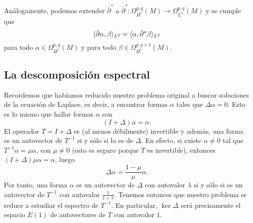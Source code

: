 \documentclass[12pt,a4paper]{article}
\theoremstyle{definition} \newtheorem{defn}[thm]{Definición}
\theoremstyle{definition} \newtheorem{ejemplo}[thm]{Ejemplo}
\theoremstyle{definition} \newtheorem{ejercicio}[thm]{Ejercicio}
\theoremstyle{remark} \newtheorem*{obs}{Observación}
\DeclarePairedDelimiter\esc{\langle}{\rangle}
\newcommand{\dol}{\bar{\partial}}
\begin{document}
    Análogamente, podemos extender $\dol^*$ a $\dol^*:\Omega^{p,q}_{H^1}(M) \rightarrow \Omega^{p,q}_{L^2}(M)$ y se cumple que
    \begin{equation*}
      \esc{\dol \alpha, \beta}_{L^2}= \esc{\alpha, \dol^*\beta}_{L^2}
    \end{equation*}
    para todo $\alpha \in \Omega^{p,q}_{H^1}(M)$ y para todo $\beta \in \Omega^{p,q+1}_{H^1}(M)$.

    \subsection{La descomposición espectral}
    Recordemos que habíamos reducido nuestro problema original a buscar soluciones de la ecuación de Laplace, es decir, a encontrar formas $\alpha$ tales que $\Delta \alpha =0$. Esto es lo mismo que hallar formas $\alpha$ con
    \begin{equation*}
      (I + \Delta) \alpha =\alpha.
    \end{equation*}
    El operador $T=I+\Delta$ es (al menos débilmente) invertible y además, una forma es un autovector de $T^{-1}$ si y sólo si lo es de $\Delta$. En efecto, si existe $\alpha\neq 0$ tal que $T^{-1}\alpha = \mu \alpha$, con $\mu \neq 0$ (esto es seguro porque $T$ es invertible), entonces $(I+\Delta)\mu \alpha = \alpha$, luego
    \begin{equation*}
      \Delta \alpha = \frac{1-\mu}{\mu}\alpha.
    \end{equation*}
    Por tanto, una forma $\alpha$ es un autovector de $\Delta$ con autovalor $\lambda$ si y sólo si es un autovector de $T^{-1}$ con autovalor $\frac{1}{1+\lambda}$. Tenemos entonces que nuestro problema se reduce a estudiar el espectro de $T^{-1}$. En particular, $\ker \Delta$ será precisamente el espacio $E(1)$ de autovectores de $T$ con autovalor $1$.
\end{document}
